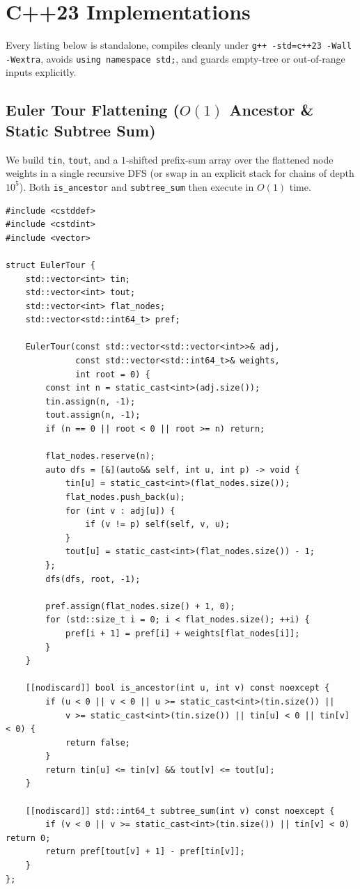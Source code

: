 \documentclass[11pt,a4paper]{article}
\theoremstyle{definition}
\begin{document}
\section{C++23 Implementations}
\label{sec:cpp}

Every listing below is standalone, compiles cleanly under \texttt{g++ -std=c++23 -Wall -Wextra}, avoids \texttt{using namespace std;}, and guards empty-tree or out-of-range inputs explicitly.

\subsection{Euler Tour Flattening (\texorpdfstring{$O(1)$}{O(1)} Ancestor \& Static Subtree Sum)}

We build \texttt{tin}, \texttt{tout}, and a $1$-shifted prefix-sum array over the flattened node weights in a single recursive DFS (or swap in an explicit stack for chains of depth $10^5$). Both \texttt{is\_ancestor} and \texttt{subtree\_sum} then execute in $O(1)$ time.

\begin{lstlisting}[caption={Euler Tour flattening with $O(1)$ ancestor test and static subtree sums.}]
#include <cstddef>
#include <cstdint>
#include <vector>

struct EulerTour {
    std::vector<int> tin;
    std::vector<int> tout;
    std::vector<int> flat_nodes;
    std::vector<std::int64_t> pref;

    EulerTour(const std::vector<std::vector<int>>& adj,
              const std::vector<std::int64_t>& weights,
              int root = 0) {
        const int n = static_cast<int>(adj.size());
        tin.assign(n, -1);
        tout.assign(n, -1);
        if (n == 0 || root < 0 || root >= n) return;

        flat_nodes.reserve(n);
        auto dfs = [&](auto&& self, int u, int p) -> void {
            tin[u] = static_cast<int>(flat_nodes.size());
            flat_nodes.push_back(u);
            for (int v : adj[u]) {
                if (v != p) self(self, v, u);
            }
            tout[u] = static_cast<int>(flat_nodes.size()) - 1;
        };
        dfs(dfs, root, -1);

        pref.assign(flat_nodes.size() + 1, 0);
        for (std::size_t i = 0; i < flat_nodes.size(); ++i) {
            pref[i + 1] = pref[i] + weights[flat_nodes[i]];
        }
    }

    [[nodiscard]] bool is_ancestor(int u, int v) const noexcept {
        if (u < 0 || v < 0 || u >= static_cast<int>(tin.size()) ||
            v >= static_cast<int>(tin.size()) || tin[u] < 0 || tin[v] < 0) {
            return false;
        }
        return tin[u] <= tin[v] && tout[v] <= tout[u];
    }

    [[nodiscard]] std::int64_t subtree_sum(int v) const noexcept {
        if (v < 0 || v >= static_cast<int>(tin.size()) || tin[v] < 0) return 0;
        return pref[tout[v] + 1] - pref[tin[v]];
    }
};
\end{lstlisting}
\end{document}
